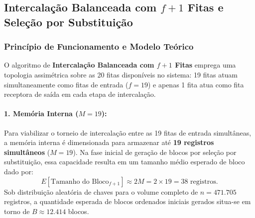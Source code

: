 \documentclass[12pt,a4paper]{article}
\begin{document}
\subsection{Intercalação Balanceada com \texorpdfstring{$f+1$}{f+1} Fitas e Seleção por Substituição}
\label{subsec:metodo_fplus1}

\subsubsection{Princípio de Funcionamento e Modelo Teórico}
O algoritmo de \textbf{Intercalação Balanceada com $f+1$ Fitas} emprega uma topologia assimétrica sobre as 20 fitas disponíveis no sistema: 19 fitas atuam simultaneamente como fitas de entrada ($f = 19$) e apenas 1 fita atua como fita receptora de saída em cada etapa de intercalação.

\paragraph{1. Memória Interna ($M = 19$):}
Para viabilizar o torneio de intercalação entre as 19 fitas de entrada simultâneas, a memória interna é dimensionada para armazenar até \textbf{19 registros simultâneos} ($M = 19$). Na fase inicial de geração de blocos por seleção por substituição, essa capacidade resulta em um tamanho médio esperado de bloco dado por:
\begin{equation}
    E[\text{Tamanho do Bloco}_{f+1}] \approx 2M = 2 \times 19 = 38 \text{ registros}.
\end{equation}
Sob distribuição aleatória de chaves para o volume completo de $n = 471.705$ registros, a quantidade esperada de blocos ordenados iniciais gerados situa-se em torno de $B \approx 12.414$ blocos.
\end{document}
